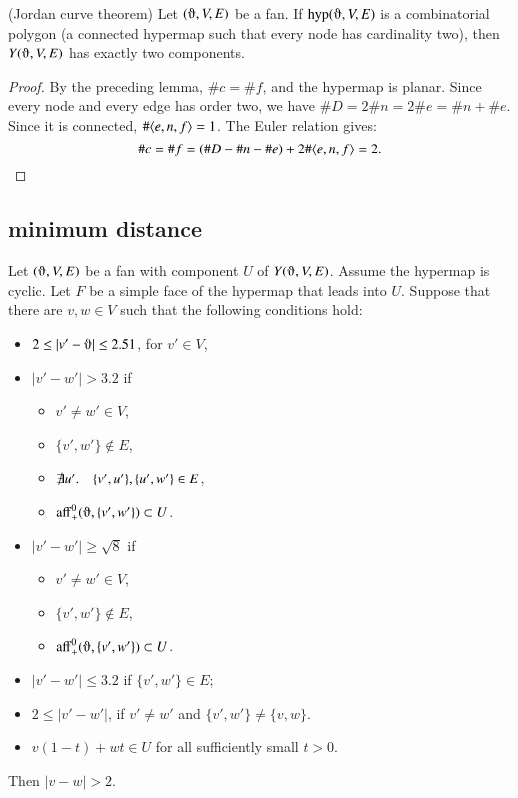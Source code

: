 \begin{lemma} (Jordan curve theorem)  Let $(\orgn,V,E)$ be a fan.
If $\op{hyp}(\orgn,V,E)$ is a combinatorial polygon (a
connected hypermap such that every node has cardinality two), then
$Y(\orgn,V,E)$ has exactly two components.
\end{lemma}

\begin{proof} By the preceding lemma, $\# c = \#f$, and the
hypermap is planar.  Since every node and every edge has order two,
we have $\#D = 2\#n = 2\# e = \#n +\#e$.  Since it is connected,
$\#\langle e,n,f\rangle = 1$.  The Euler relation gives:
    $$
    \#c = \#f = (\#D - \#n - \#e) + 2\#\langle e,n,f\rangle =2.
    $$
\end{proof}


\subsection{minimum distance}

\begin{lemma}\label{dist2} Let $(\orgn,V,E)$ be a fan with component $U$ of
$Y(\orgn,V,E)$.  Assume the hypermap is cyclic. 
Let $F$ be a simple face of the hypermap
that leads into $U$.   Suppose that there are $v,w\in V$ such that
the following conditions hold:
\begin{itemize}
 \item $2\le |v'-\orgn| \le 2.51$, for $v'\in V$,
 \item $|v'-w'|> 3.2$ if
    \begin{itemize}
       \item $v'\ne w'\in V$,
       \item $\{v',w'\}\not\in E$,
       \item $\not\exists u'.\quad \{v',u'\}, \{u',w'\}\in E$,
       \item $\op{aff}_+^0(\orgn,\{v',w'\})\subset U$.
    \end{itemize}
 \item $|v'-w'|\ge \sqrt8$ if
    \begin{itemize}
      \item $v'\ne w'\in V$,
      \item $\{v',w'\}\not\in E$,
      \item $\op{aff}_+^0(\orgn,\{v',w'\})\subset U$.
    \end{itemize}
 \item $|v'-w'|\le 3.2$ if $\{v',w'\}\in E$;
 \item $2\le |v'-w'|$, if $v'\ne w'$ and $\{v',w'\}\ne \{v,w\}$.
 \item $v(1-t) + w t \in U$ for all sufficiently small $t>0$.
\end{itemize}
Then $|v-w|>2$.
\end{lemma}


